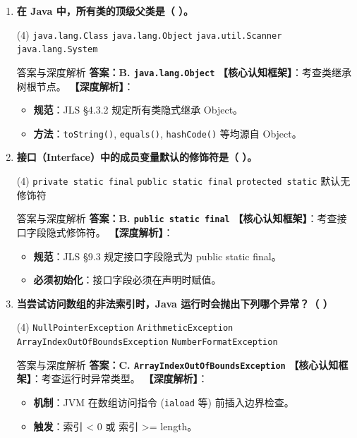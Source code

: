 ﻿\documentclass[12pt, a4paper]{ctexart}
\newcommand{\code}[1]{\texttt{#1}}
\begin{document}
\begin{enumerate}[label=\textbf{\arabic*.}, leftmargin=*, itemsep=1.5em]
	\item \textbf{在 Java 中，所有类的顶级父类是（ \quad ）。}
	      \begin{tasks}(4)
		      \task \code{java.lang.Class} \task \code{java.lang.Object} \task \code{java.util.Scanner} \task \code{java.lang.System}
	      \end{tasks}
	      \begin{bluebox}{答案与深度解析}
		      \textbf{答案：B. \code{java.lang.Object}}
		      \textbf{【核心认知框架】}：考查类继承树根节点。
		      \textbf{【深度解析】}：
		      \begin{itemize}[leftmargin=*, nosep]
			      \item \textbf{规范}：JLS §4.3.2 规定所有类隐式继承 Object。
			      \item \textbf{方法}：\code{toString()}, \code{equals()}, \code{hashCode()} 等均源自 Object。
		      \end{itemize}
	      \end{bluebox}

	\item \textbf{接口（Interface）中的成员变量默认的修饰符是（ \quad ）。}
	      \begin{tasks}(4)
		      \task \code{private static final} \task \code{public static final} \task \code{protected static} \task 默认无修饰符
	      \end{tasks}
	      \begin{bluebox}{答案与深度解析}
		      \textbf{答案：B. \code{public static final}}
		      \textbf{【核心认知框架】}：考查接口字段隐式修饰符。
		      \textbf{【深度解析】}：
		      \begin{itemize}[leftmargin=*, nosep]
			      \item \textbf{规范}：JLS §9.3 规定接口字段隐式为 public static final。
			      \item \textbf{必须初始化}：接口字段必须在声明时赋值。
		      \end{itemize}
	      \end{bluebox}

	\item \textbf{当尝试访问数组的非法索引时，Java 运行时会抛出下列哪个异常？（ \quad ）}
	      \begin{tasks}(4)
		      \task \code{NullPointerException} \task \code{ArithmeticException} \task \code{ArrayIndexOutOfBoundsException} \task \code{NumberFormatException}
	      \end{tasks}
	      \begin{bluebox}{答案与深度解析}
		      \textbf{答案：C. \code{ArrayIndexOutOfBoundsException}}
		      \textbf{【核心认知框架】}：考查运行时异常类型。
		      \textbf{【深度解析】}：
		      \begin{itemize}[leftmargin=*, nosep]
			      \item \textbf{机制}：JVM 在数组访问指令 (\code{iaload} 等) 前插入边界检查。
			      \item \textbf{触发}：索引 < 0 或 索引 >= length。
		      \end{itemize}
	      \end{bluebox}


\end{enumerate}
\end{document}
